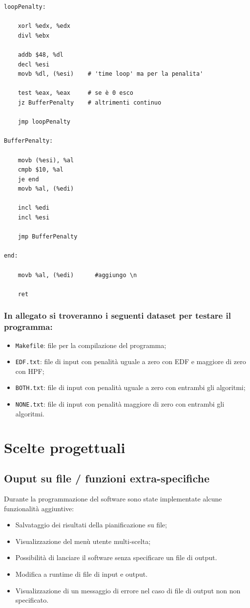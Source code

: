 \documentclass[a4paper]{report}
\begin{document}
\begin{itemize}
\begin{lstlisting}[firstnumber=1]
loopPenalty:

    xorl %edx, %edx
    divl %ebx

    addb $48, %dl
    decl %esi
    movb %dl, (%esi)    # 'time loop' ma per la penalita'

    test %eax, %eax     # se è 0 esco
    jz BufferPenalty    # altrimenti continuo

    jmp loopPenalty

BufferPenalty:

    movb (%esi), %al
    cmpb $10, %al
    je end
    movb %al, (%edi)

    incl %edi
    incl %esi

    jmp BufferPenalty

end:

    movb %al, (%edi)      #aggiungo \n
    
    ret

    \end{lstlisting}
    

  \end{itemize}

\subsubsection{In allegato si troveranno i seguenti dataset per testare il programma:}
\begin{itemize}
  \item \texttt{Makefile}: file per la compilazione del programma;
  \item \texttt{EDF.txt}: file di input con penalità uguale a zero con EDF e maggiore di zero con HPF;
  \item \texttt{BOTH.txt}: file di input con penalità uguale a zero con entrambi gli algoritmi;
  \item \texttt{NONE.txt}: file di input con penalità maggiore di zero con entrambi gli algoritmi.
\end{itemize}

\section{Scelte progettuali}

  \subsection{Ouput su file / funzioni extra-specifiche}
  Durante la programmazione del software sono state implementate alcune funzionalità aggiuntive:
    \begin{itemize}
      \item Salvataggio dei risultati della pianificazione su file;
      \item Visualizzazione del menù utente multi-scelta;
      \item Possibilità di lanciare il software senza specificare un file di output.
      \item Modifica a runtime di file di input e output.
      \item Visualizzazione di un messaggio di errore nel caso di file di output non non specificato.
    \end{itemize}
\end{document}
